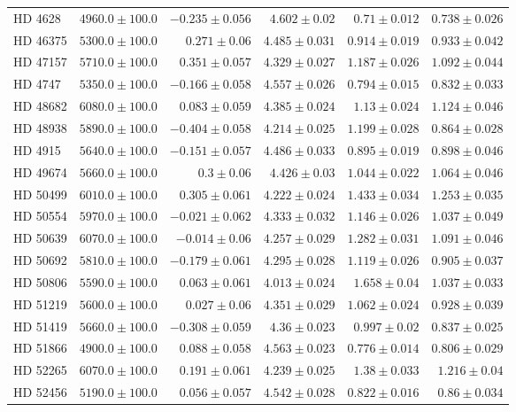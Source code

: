 \begin{longtable*}{lrrrrr}
HD 4628 & $4960.0\pm 100.0$ & $-0.235\pm 0.056$ & $4.602\pm 0.02$ & $0.71\pm 0.012$ & $0.738\pm 0.026$ \\ 
HD 46375 & $5300.0\pm 100.0$ & $0.271\pm 0.06$ & $4.485\pm 0.031$ & $0.914\pm 0.019$ & $0.933\pm 0.042$ \\ 
HD 47157 & $5710.0\pm 100.0$ & $0.351\pm 0.057$ & $4.329\pm 0.027$ & $1.187\pm 0.026$ & $1.092\pm 0.044$ \\ 
HD 4747 & $5350.0\pm 100.0$ & $-0.166\pm 0.058$ & $4.557\pm 0.026$ & $0.794\pm 0.015$ & $0.832\pm 0.033$ \\ 
HD 48682 & $6080.0\pm 100.0$ & $0.083\pm 0.059$ & $4.385\pm 0.024$ & $1.13\pm 0.024$ & $1.124\pm 0.046$ \\ 
HD 48938 & $5890.0\pm 100.0$ & $-0.404\pm 0.058$ & $4.214\pm 0.025$ & $1.199\pm 0.028$ & $0.864\pm 0.028$ \\ 
HD 4915 & $5640.0\pm 100.0$ & $-0.151\pm 0.057$ & $4.486\pm 0.033$ & $0.895\pm 0.019$ & $0.898\pm 0.046$ \\ 
HD 49674 & $5660.0\pm 100.0$ & $0.3\pm 0.06$ & $4.426\pm 0.03$ & $1.044\pm 0.022$ & $1.064\pm 0.046$ \\ 
HD 50499 & $6010.0\pm 100.0$ & $0.305\pm 0.061$ & $4.222\pm 0.024$ & $1.433\pm 0.034$ & $1.253\pm 0.035$ \\ 
HD 50554 & $5970.0\pm 100.0$ & $-0.021\pm 0.062$ & $4.333\pm 0.032$ & $1.146\pm 0.026$ & $1.037\pm 0.049$ \\ 
HD 50639 & $6070.0\pm 100.0$ & $-0.014\pm 0.06$ & $4.257\pm 0.029$ & $1.282\pm 0.031$ & $1.091\pm 0.046$ \\ 
HD 50692 & $5810.0\pm 100.0$ & $-0.179\pm 0.061$ & $4.295\pm 0.028$ & $1.119\pm 0.026$ & $0.905\pm 0.037$ \\ 
HD 50806 & $5590.0\pm 100.0$ & $0.063\pm 0.061$ & $4.013\pm 0.024$ & $1.658\pm 0.04$ & $1.037\pm 0.033$ \\ 
HD 51219 & $5600.0\pm 100.0$ & $0.027\pm 0.06$ & $4.351\pm 0.029$ & $1.062\pm 0.024$ & $0.928\pm 0.039$ \\ 
HD 51419 & $5660.0\pm 100.0$ & $-0.308\pm 0.059$ & $4.36\pm 0.023$ & $0.997\pm 0.02$ & $0.837\pm 0.025$ \\ 
HD 51866 & $4900.0\pm 100.0$ & $0.088\pm 0.058$ & $4.563\pm 0.023$ & $0.776\pm 0.014$ & $0.806\pm 0.029$ \\ 
HD 52265 & $6070.0\pm 100.0$ & $0.191\pm 0.061$ & $4.239\pm 0.025$ & $1.38\pm 0.033$ & $1.216\pm 0.04$ \\ 
HD 52456 & $5190.0\pm 100.0$ & $0.056\pm 0.057$ & $4.542\pm 0.028$ & $0.822\pm 0.016$ & $0.86\pm 0.034$ \\ 

\end{longtable*}

